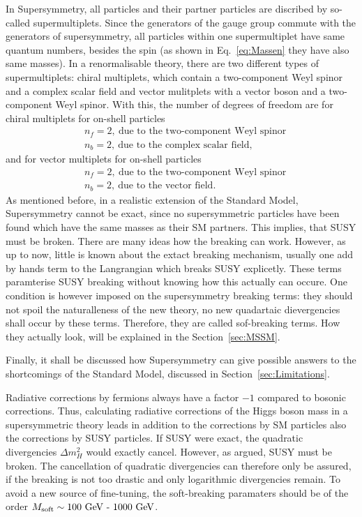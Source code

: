 In Supersymmetry, all particles and their partner particles are discribed by so-called supermultiplets.
Since the generators of the gauge group commute with the generators of supersymmetry, all particles within one supermultiplet have same quantum numbers, besides the spin (as shown in Eq.~\ref{eq:Massen} they have also same masses).
In a renormalisable theory, there are two different types of supermultiplets: chiral multiplets, which contain a  two-component Weyl spinor and a complex scalar field and vector mulitplets with a vector boson and a two-component Weyl spinor.
With this, the number of degrees of freedom are for chiral multiplets for on-shell particles
\begin{equation*}
\begin{split}
& n_f=2,\ \text{due to the two-component Weyl spinor}\\
& n_b=2,\ \text{due to the complex scalar field}, 
\end{split}
\end{equation*}
and for vector multiplets for on-shell particles
\begin{equation*}
\begin{split}
& n_f=2,\ \text{due to the two-component Weyl spinor}\\
& n_b=2,\ \text{due to the vector field}. 
\end{split}
\end{equation*}
As mentioned before, in a realistic extension of the Standard Model, Supersymmetry cannot be exact, since no supersymmetric particles have been found which have the same masses as their SM partners.
This implies, that SUSY must be broken.
There are many ideas how the breaking can work.
However, as up to now, little is known about the extact breaking mechanism, usually one add by hands term to the Langrangian which breaks SUSY explicetly.
These terms paramterise SUSY breaking without knowing how this actually can occure.
One condition is however imposed on the supersymmetry breaking terms: they should not spoil the naturalleness of the new theory, \ie no new quadartaic dievergencies shall occur by these terms.
Therefore, they are called sof-breaking terms.
How they actually look, will be explained in the Section~\ref{sec:MSSM}.

Finally, it shall be discussed how Supersymmetry can give possible answers to the shortcomings of the Standard Model, discussed in Section~\ref{sec:Limitations}.

Radiative corrections by fermions always have a factor $-1$ compared to bosonic corrections.
Thus, calculating radiative corrections of the Higgs boson mass in a supersymmetric theory leads in addition to the corrections by SM particles also the corrections by SUSY particles.
If SUSY were exact, the quadratic divergencies $\Delta m^2_H$ would exactly cancel. 
However, as argued, SUSY must be broken.
The cancellation of quadratic divergencies can therefore only be assured, if the breaking is not too drastic and only logarithmic divergencies remain.
To avoid a new source of fine-tuning, the soft-breaking paramaters should be of the order $M_{\rm soft} \sim 100\text{ GeV - } 1000\text{ GeV}$.




